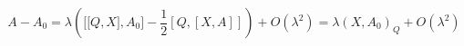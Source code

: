 \begin{equation} A-A_{0}=\lambda\left(  \lbrack\lbrack
Q,X],A_{0}]-\frac{1}{2}[Q,[X,A]]\right)
+O(\lambda^{2})=\lambda(X,A_{0})_{Q}+O(\lambda^{2})\label{1.17}%
\end{equation}

